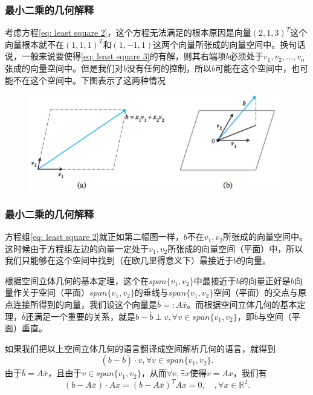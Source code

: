 \documentclass[10pt]{beamer}
\def\R{\mathbb{R}}
\begin{document}
\begin{frame}
\frametitle{最小二乘的几何解释}
考虑方程\eqref{eq: least square 2}，这个方程无法满足的根本原因是向量$(2,1,3)^T$这个向量根本就不在$(1,1,1)^T$和$(1,-1,1)$这两个向量所张成的向量空间中。换句话说，一般来说要使得\eqref{eq: least square 3}的有解，则其右端项$b$必须处于$v_1, v_2, \ldots, v_n$张成的向量空间中。但是我们对$b$没有任何的控制，所以$b$可能在这个空间中，也可能不在这个空间中。下图表示了这两种情况
\begin{figure}
\includegraphics[width=11cm]{figs/4-1-1_Vector_Representation-1} 
\end{figure}
\end{frame}


\begin{frame}
\frametitle{最小二乘的几何解释}
方程组\eqref{eq: least square 2}就正如第二幅图一样，$b$不在$v_1,v_2$所张成的向量空间中。这时候由于方程组左边的向量一定处于$v_1,v_2$所张成的向量空间（平面）中，所以我们只能够在这个空间中找到（在欧几里得意义下）最接近于$b$的向量。

\vspace{0.2cm}

根据空间立体几何的基本定理，这个在$span\{ v_1, v_2\}$中最接近于$b$的向量正好是$b$向量作关于空间（平面）$span\{ v_1, v_2\}$的垂线与$span\{ v_1, v_2\}$空间（平面）的交点与原点连接所得到的向量，我们设这个向量是$\bar{b} =: A\bar{x}$。而根据空间立体几何的基本定理，$\bar{b}$还满足一个重要的关系，就是$b - \bar{b} \perp v, \forall v \in span\{ v_1, v_2\}$，即$\bar{b}$与空间（平面）垂直。

\vspace{0.2cm}

如果我们把以上空间立体几何的语言翻译成空间解析几何的语言，就得到
\begin{equation}
(b - \bar{b}) \cdot v,  \forall v \in span\{ v_1, v_2\}.
\end{equation}
由于$\bar{b} = A\bar{x}$，且由于$v \in span\{ v_1, v_2\}$，从而$\forall v, \exists x$使得$v = Ax$，我们有
\begin{equation}
\label{eq: least square 4}
 (b - A\bar{x}) \cdot Ax = (b - A\bar{x})^T  Ax = 0, \quad, \forall x \in \R^2.
\end{equation}
\end{frame}
\end{document}
